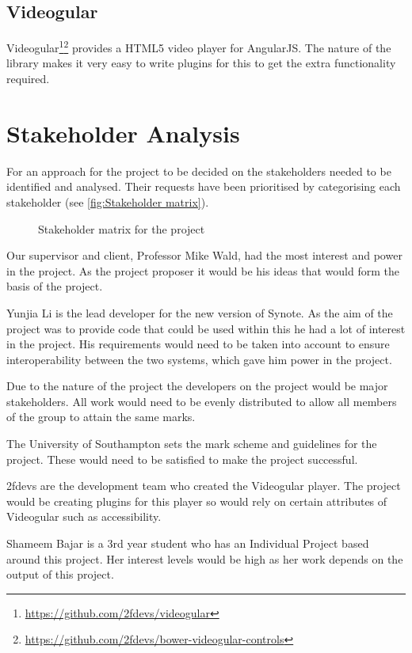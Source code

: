 \subsection{Videogular}
\label{Section:Videogular}
\gls{Videogular}\footnote{\url{https://github.com/2fdevs/videogular}}\footnote{\url{https://github.com/2fdevs/bower-videogular-controls}} provides a HTML5 video player for \gls{AngularJS}. The nature of the library makes it very easy to write plugins for this to get the extra functionality required.

\section{Stakeholder Analysis}
For an approach for the project to be decided on the stakeholders needed to be identified and analysed. Their requests have been prioritised by categorising each stakeholder (see \autoref{fig:Stakeholder matrix}).
\begin{figure}[h!]
\centering

\caption{Stakeholder matrix for the project\label{fig:Stakeholder matrix}}
\end{figure}

Our supervisor and client, Professor Mike Wald, had the most interest and power in the project. As the project proposer it would be his ideas that would form the basis of the project.

Yunjia Li is the lead developer for the new version of Synote. As the aim of the project was to provide code that could be used within this he had a lot of interest in the project. His requirements would need to be taken into account to ensure interoperability between the two systems, which gave him power in the project.

Due to the nature of the project the developers on the project would be major stakeholders. All work would need to be evenly distributed to allow all members of the group to attain the same marks.

The University of Southampton sets the mark scheme and guidelines for the project. These would need to be satisfied to make the project successful.

2fdevs are the development team who created the \gls{Videogular} player. The project would be creating plugins for this player so would rely on certain attributes of \gls{Videogular} such as accessibility. 

Shameem Bajar is a 3rd year student who has an Individual Project based around this project. Her interest levels would be high as her work depends on the output of this project. 


